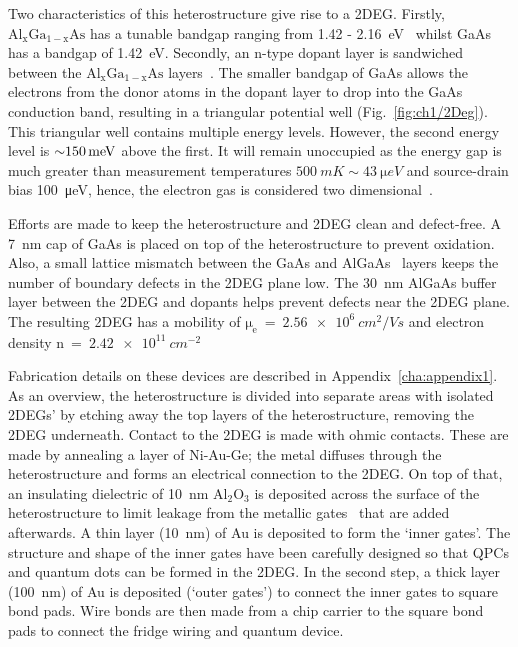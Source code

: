 Two characteristics of this heterostructure give rise to a 2DEG. Firstly, $\mathrm{Al_xGa_{1-x}As}$ has a tunable bandgap ranging from 1.42 - \qty{2.16}{eV}~\cite{gaas_overview} whilst GaAs has a bandgap of \qty{1.42}{eV}. Secondly, an n-type dopant layer is sandwiched between the $\mathrm{Al_xGa_{1-x}As}$ layers~\cite{dopant_layer}. The smaller bandgap of GaAs allows the electrons from the donor atoms in the dopant layer to drop into the GaAs conduction band, resulting in a triangular potential well (Fig.~\ref{fig:ch1/2Deg}). This triangular well contains multiple energy levels. However, the second energy level is $\qty{\sim 150}{meV}$ above the first. It will remain unoccupied as the energy gap is much greater than measurement temperatures $\qty{500}{mK}\sim\qty{43}{\micro eV}$ and source-drain bias \qty{100}{\micro eV}, hence, the electron gas is considered two dimensional~\cite{BEENAKKER_1991}.

Efforts are made to keep the heterostructure and 2DEG clean and defect-free. A \qty{7}{nm} cap of GaAs is placed on top of the heterostructure to prevent oxidation. Also, a small lattice mismatch between the GaAs and AlGaAs~\cite{gaas_superlattice} layers keeps the number of boundary defects in the 2DEG plane low. The \qty{30}{nm} AlGaAs buffer layer between the 2DEG and dopants helps prevent defects near the 2DEG plane. The resulting 2DEG has a mobility of $\mathrm{\mu_e}~=~\qty{2.56e6}{cm^2/Vs}$ and electron density $\mathrm{n}~=~\qty{2.42e11}{cm^{-2}}$

Fabrication details on these devices are described in Appendix~\ref{cha:appendix1}. As an overview, the heterostructure is divided into separate areas with isolated 2DEGs' by etching away the top layers of the heterostructure, removing the 2DEG underneath. Contact to the 2DEG is made with ohmic contacts. These are made by annealing a layer of Ni-Au-Ge; the metal diffuses through the heterostructure and forms an electrical connection to the 2DEG. On top of that, an insulating dielectric of \qty{10}{nm} $\mathrm{Al_2O_3}$ is deposited across the surface of the heterostructure to limit leakage from the metallic gates~\cite{insulating_gates} that are added afterwards. A thin layer (\qty{10}{nm}) of Au is deposited to form the `inner gates'. The structure and shape of the inner gates have been carefully designed so that QPCs and quantum dots can be formed in the 2DEG. In the second step, a thick layer (\qty{100}{nm}) of Au is deposited (`outer gates') to connect the inner gates to square bond pads. Wire bonds are then made from a chip carrier to the square bond pads to connect the fridge wiring and quantum device. 




